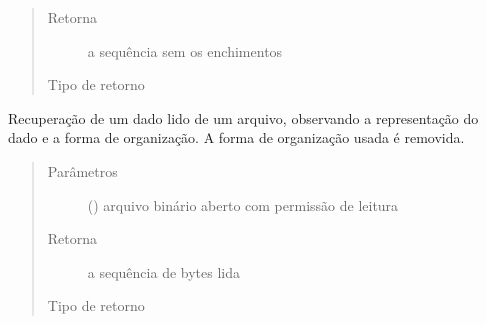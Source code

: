 \documentclass[letterpaper,10pt,brazil]{sphinxmanual}
\begin{document}
\begin{fulllineitems}
\begin{fulllineitems}
\begin{quote}
\begin{description}
\item[{Retorna}] \leavevmode
\sphinxAtStartPar
a sequência sem os enchimentos

\item[{Tipo de retorno}] \leavevmode
\sphinxAtStartPar
{}

\end{description}\end{quote}

\end{fulllineitems}


\begin{fulllineitems}
\label{\detokenize{estrutarq.dado:estrutarq.dado.DadoBasico.leia_de_arquivo}}
\pysigstartsignatures
{}
\pysigstopsignatures
\sphinxAtStartPar
Recuperação de um dado lido de um arquivo, observando a representação
do dado e a forma de organização. A forma de organização usada é
removida.
\begin{quote}\begin{description}
\item[{Parâmetros}] \leavevmode
\sphinxAtStartPar
{} () \textendash{} arquivo binário aberto com permissão de leitura

\item[{Retorna}] \leavevmode
\sphinxAtStartPar
a sequência de bytes lida

\item[{Tipo de retorno}] \leavevmode
\sphinxAtStartPar
{}

\end{description}\end{quote}

\end{fulllineitems}



\end{fulllineitems}
\end{document}

